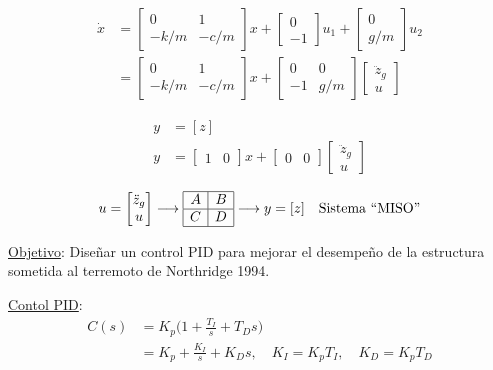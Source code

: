 \begin{align*}
    {\dot{x}} &=
    \begin{bmatrix}
    0 & 1\\
    -k/m & -c/m
    \end{bmatrix}{x} +
    \begin{bmatrix}
    0 \\ -1
    \end{bmatrix}u_1+
    \begin{bmatrix}
    0 \\ g/m
    \end{bmatrix}u_2 \\
    &= \begin{bmatrix} 0 & 1\\-k/m & -c/m
    \end{bmatrix}{x} +
    \begin{bmatrix}
    0 & 0\\ -1 & g/m
    \end{bmatrix} 
    \begin{bmatrix}
    \ddot{z}_g\\ u
    \end{bmatrix}
\end{align*}

\begin{align*}
    {y}&=[z]\\
    {y}&= \begin{bmatrix}1 & 0 \end{bmatrix}{x}+\begin{bmatrix}0 & 0 \end{bmatrix}\begin{bmatrix}
    \ddot{z}_g\\ u
    \end{bmatrix}
\end{align*}

\begin{align}
    {u}=\begin{bmatrix}
    \ddot{z}_g\\ u
    \end{bmatrix}\longrightarrow
    \begin{array} {|r|r|}
      \hline A & B \\
      \hline C & D \\
      \hline 
    \end{array}
    \longrightarrow {y}=[z] \quad \text{Sistema ``MISO''}
\end{align}


\underline{Objetivo}: Diseñar un control PID para mejorar el desempeño de la estructura sometida al terremoto de Northridge 1994.\\
\par \underline{Contol PID}: 
\begin{align*}
    C(s)&=K_p\bigg(1+\frac{T_I}{s}+T_Ds\bigg)\\
    &= K_p+\frac{K_I}{s}+K_Ds, \quad K_I=K_pT_I, \quad K_D=K_pT_D
\end{align*}

